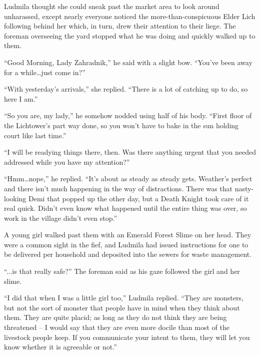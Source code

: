  

Ludmila thought she could sneak past the market area to look around unharassed, except nearly everyone noticed the more-than-conspicuous Elder Lich following behind her which, in turn, drew their attention to their liege. The foreman overseeing the yard stopped what he was doing and quickly walked up to them.

 

“Good Morning, Lady Zahradnik,” he said with a slight bow. “You’ve been away for a while…just come in?”

 

“With yesterday’s arrivals,” she replied. “There is a lot of catching up to do, so here I am.”

 

“So you are, my lady,” he somehow nodded using half of his body. “First floor of the Lichtower’s part way done, so you won’t have to bake in the sun holding court like last time.”

 

“I will be readying things there, then. Was there anything urgent that you needed addressed while you have my attention?”

 

“Hmm…nope,” he replied. “It’s about as steady as steady gets. Weather’s perfect and there isn’t much happening in the way of distractions. There was that nasty-looking Demi that popped up the other day, but a Death Knight took care of it real quick. Didn’t even know what happened until the entire thing was over, so work in the village didn’t even stop.”

 

A young girl walked past them with an Emerald Forest Slime on her head. They were a common sight in the fief, and Ludmila had issued instructions for one to be delivered per household and deposited into the sewers for waste management.

 

“...is that really safe?” The foreman said as his gaze followed the girl and her slime.

 

“I did that when I was a little girl too,” Ludmila replied. “They are monsters, but not the sort of monster that people have in mind when they think about them. They are quite placid; as long as they do not think they are being threatened – I would say that they are even more docile than most of the livestock people keep. If you communicate your intent to them, they will let you know whether it is agreeable or not.”

